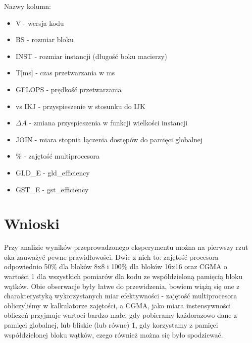 \documentclass[10pt,a4paper]{article}
\begin{document}
Nazwy kolumn:
\begin{itemize}
	\item V - wersja kodu 
	\item BS - rozmiar bloku 
	\item INST - rozmiar instancji (długość boku macierzy)
	\item T[ms] - czas przetwarzania w ms 
	\item GFLOPS - prędkość przetwarzania
	\item vs IKJ - przyspieszenie w stosunku do IJK 
	\item $\Delta A$ - zmiana przyspieszenia w funkcji wielkości instancji
	\item JOIN - miara stopnia łączenia dostępów do pamięci globalnej
	\item \% - zajętość multiprocesora
	\item GLD\_E - gld\_efficiency 
	\item GST\_E - gst\_efficiency
\end{itemize}


\section{Wnioski}
Przy analizie wyników przeprowadzonego eksperymentu można na pierwszy rzut oka zauważyć
pewne prawidłowości. Dwie z nich to: zajętość procesora odpowiednio 50\% dla bloków 8x8 i 
100\% dla bloków 16x16 oraz CGMA o wartości 1 dla wszystkich pomiarów dla kodu ze współdzieloną
pamięcią bloku wątków. Obie obserwacje były łatwe do przewidzenia, bowiem wiążą się one z charakterystyką
wykorzystanych miar efektywności - zajętość multiprocesora obliczyliśmy w kalkulatorze zajętości,
a CGMA, jako miara instensywności obliczeń przyjmuje wartoci bardzo małe, gdy pobieramy 
każdorazowo dane z pamięci globalnej, lub bliskie (lub równe) 1, gdy korzystamy z pamięci
współdzielonej bloku wątków, czego również można się było spodziewać.
\end{document}
